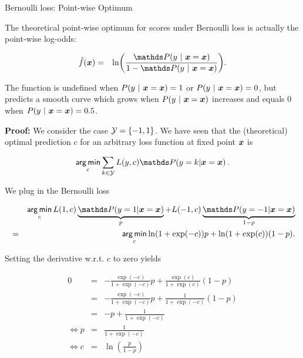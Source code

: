 \begin{vbframe}{Bernoulli loss: Point-wise Optimum}

The theoretical point-wise optimum for scores under Bernoulli loss is actually
the point-wise log-odds:

\begin{eqnarray*}
\fh(\xv) &=&  \ln \biggl(\frac{\P(y~|~\xv = \xv)}{1-\P(y~|~\xv = \xv)}\biggr).
\end{eqnarray*}

The function is undefined when $P(y~|~\bm{x} = \bm{x}) = 1$ or $P(y~|~\bm{x} = \bm{x}) = 0$, but predicts a smooth curve which grows when $P(y~|~\bm{x} = \bm{x})$ increases and equals $0$ when $P(y~|~\bm{x} = \bm{x}) = 0.5$.

\lz 

\textbf{Proof: } We consider the case $\mathcal{Y} = \{-1, 1\}$. We have seen that the (theoretical) optimal prediction $c$ for an arbitrary loss function at fixed point $\bm{x}$ is

$$
\argmin_{c} \sum_{k \in \Yspace} L(y, c) \P(y = k| \xv = \xv)\,.
$$

\framebreak 

We plug in the Bernoulli loss

\vspace*{-0.3cm}

\begin{footnotesize}
  \begin{eqnarray*}
    && \argmin_c L(1, c) \underbrace{\P(y = 1| \xv = \xv)}_p + L(-1, c) \underbrace{\P(y = -1| \xv = \xv)}_{1 - p} \\ 
    &=&  \argmin_c \ln(1 + \exp(-c)) p + \ln(1 + \exp(c)) (1 - p).
  \end{eqnarray*}
\end{footnotesize}

\vspace*{-0.3cm}

Setting the derivative w.r.t. $c$ to zero yields

\vspace*{-0.3cm}

\begin{footnotesize}
  \begin{eqnarray*}
  0 &=& - \frac{\exp(-c)}{1 + \exp(-c)} p + \frac{\exp(c)}{1 + \exp(c)} (1 - p) \\ 
   &=& - \frac{\exp(-c)}{1 + \exp(-c)} p + \frac{1}{1 + \exp(- c)} (1 - p) \\ 
  &=& - p + \frac{1}{1 + \exp(-c)} \\
  \Leftrightarrow p &=& \frac{1}{1 + \exp(-c)} \\
  \Leftrightarrow c &=& \ln\left(\frac{p}{1 - p}\right)
  \end{eqnarray*}
\end{footnotesize}



\end{vbframe}
